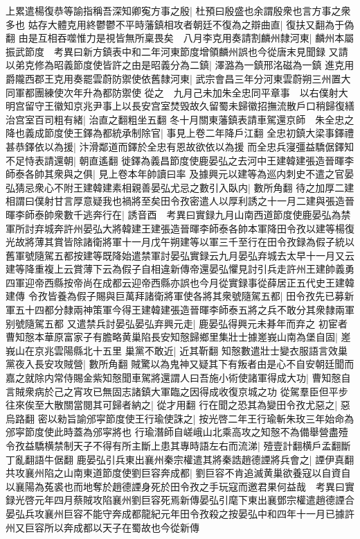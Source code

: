 上累遣楊復恭等諭指稱吾深知卿寃方事之殷|{
	杜預曰殷盛也余謂殷衆也言方事之衆多也}
姑存大體克用終鬱鬱不平時藩鎮相攻者朝廷不復為之辯曲直|{
	復扶又翻為于偽翻}
由是互相吞噬惟力是視皆無所稟畏矣　八月李克用奏請割麟州隸河東|{
	麟州本屬振武節度　考異曰新方鎮表中和二年河東節度增領麟州誤也今從唐末見聞録}
又請以弟克修為昭義節度使皆許之由是昭義分為二鎮|{
	澤潞為一鎮邢洺磁為一鎮}
進克用爵隴西郡王克用奏罷雲蔚防禦使依舊隸河東|{
	武宗會昌三年分河東雲蔚朔三州置大同軍都團練使次年升為都防禦使}
從之　九月己未加朱全忠同平章事　以右僕射大明宫留守王徽知京兆尹事上以長安宫室焚毁故久留蜀未歸徽招撫流散戶口稍歸復繕治宫室百司粗有緒|{
	治直之翻粗坐五翻}
冬十月關東藩鎮表請車駕還京師　朱全忠之降也義成節度使王鐸為都統承制除官|{
	事見上卷二年降戶江翻}
全忠初鎮大梁事鐸禮甚恭鐸依以為援|{
	汴滑鄰道而鐸於全忠有恩故欲依以為援}
而全忠兵寖彊益驕倨鐸知不足恃表請還朝|{
	朝直遙翻}
徙鐸為義昌節度使鹿晏弘之去河中王建韓建張造晉暉李師泰各帥其衆與之俱|{
	見上卷本年帥讀曰率}
及據興元以建等為巡内刺史不遣之官晏弘猜忌衆心不附王建韓建素相親善晏弘尤忌之數引入臥内|{
	數所角翻}
待之加厚二建相謂曰僕射甘言厚意疑我也禍將至矣田令孜密遣人以厚利誘之十一月二建與張造晉暉李師泰帥衆數千逃奔行在|{
	誘音酉　考異曰實録九月山南西道節度使鹿晏弘為禁軍所討弃城奔許州晏弘大將韓建王建張造晉暉李師泰各帥本軍降田令孜以建等楊復光故將薄其賞皆除諸衛將軍十一月戊午朔建等以軍三千至行在田令孜録為假子統以舊軍號隨駕五都按建等既降始遣禁軍討晏弘實録云九月晏弘弃城去太早十一月又云建等降重複上云賞薄下云為假子自相違新傳帝還晏弘懼見討引兵走許州王建帥義勇四軍迎帝西縣按帝尚在成都云迎帝西縣亦誤也今月從實録事從薛居正五代史王建韓建傳}
令孜皆養為假子賜與巨萬拜諸衛將軍使各將其衆號隨駕五都|{
	田令孜先已募新軍五十四都分隸兩神策軍今得王建韓建張造晉暉李師泰五將之兵不敢分其衆隸兩軍别號隨駕五都}
又遣禁兵討晏弘晏弘弃興元走|{
	鹿晏弘得興元未朞年而弃之}
初宦者曹知慤本華原富家子有膽略黄巢陷長安知慤歸鄉里集壯士據嵳峩山南為堡自固|{
	嵳峩山在京兆雲陽縣北十五里}
巢黨不敢近|{
	近其靳翻}
知慤數遣壯士變衣服語言效巢黨夜入長安攻賊營|{
	數所角翻}
賊驚以為鬼神又疑其下有叛者由是心不自安朝廷聞而嘉之就除内常侍賜金紫知慤聞車駕將還謂人曰吾施小術使諸軍得成大功|{
	曹知慤自言賊衆病於己之宵攻已無固志諸鎮大軍臨之因得成收復京城之功}
從駕羣臣但平步往來俟至大散關當閱其可歸者納之|{
	從才用翻}
行在聞之恐其為變田令孜尤惡之|{
	惡烏路翻}
密以勑旨諭邠寜節度使王行瑜使誅之|{
	按光啓二年王行瑜斬朱玫三年始命為邠寜節度使此時蓋為邠寜將也}
行瑜潛師自嵯峨山北乘高攻之知慤不為備舉營盡殪令孜益驕横禁制天子不得有所主斷上患其專時語左右而流涕|{
	殪壹計翻横戶孟翻斷丁亂翻語牛倨翻}
鹿晏弘引兵東出襄州秦宗權遣其將秦誥趙德諲將兵會之|{
	諲伊真翻}
共攻襄州陷之山南東道節度使劉巨容奔成都|{
	劉巨容不肯追滅黄巢欲養寇以自資自以襄陽為菟裘也而地奪於趙德諲身死於田令孜之手玩寇而邀君果何益哉　考異曰實録光啓元年四月蔡賊攻陷襄州劉巨容死焉新傳晏弘引麾下東出襄鄧宗權遣趙德諲合晏弘兵攻襄州巨容不能守奔成都龍紀元年田令孜殺之按晏弘中和四年十一月已據許州又巨容所以奔成都以天子在蜀故也今從新傳}
